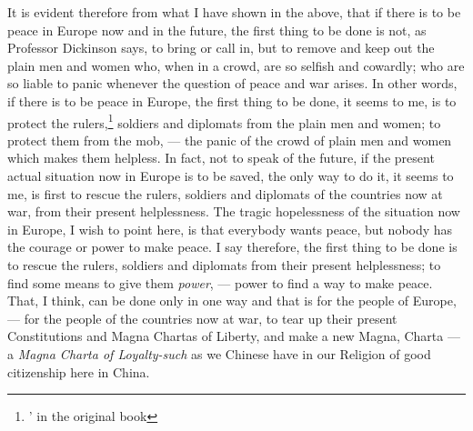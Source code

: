 It is evident therefore from what I have shown in the above, that if there is to be peace in Europe now and in the future, the first thing to be done is not, as Professor Dickinson says, to bring or call in, but to remove and keep out the plain men and women who, when in a crowd, are so selfish and cowardly; who are so liable to panic whenever the question of peace and war arises.
In other words, if there is to be peace in Europe, the first thing to be done, it seems to me, is to protect the rulers,\footnote{' in the original book} soldiers and diplomats from the plain men and women; to protect them from the mob, --- the panic of the crowd of plain men and women which makes them helpless.
In fact, not to speak of the future, if the present actual situation now in Europe is to be saved, the only way to do it, it seems to me, is first to rescue the rulers, soldiers and diplomats of the countries now at war, from their present helplessness.
The tragic hopelessness of the situation now in Europe, I wish to point here, is that everybody wants peace, but nobody has the courage or power to make peace.
I say therefore, the first thing to be done is to rescue the rulers, soldiers and diplomats from their present helplessness; to find some means to give them \emph{power}, --- power to find a way to make peace.
That, I think, can be done only in one way and that is for the people of Europe, --- for the people of the countries now at war, to tear up their present Constitutions and Magna Chartas of Liberty, and make a new Magna, Charta --- a \emph{Magna Charta of Loyalty-such} as we Chinese have in our Religion of good citizenship here in China.

